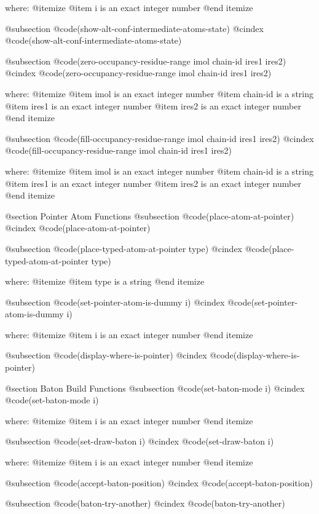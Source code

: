 where: 
 @itemize 
     @item i is an exact integer number
 @end itemize


@subsection @code{(show-alt-conf-intermediate-atoms-state)}
@cindex @code{(show-alt-conf-intermediate-atoms-state)}
 
@subsection @code{(zero-occupancy-residue-range imol chain-id ires1 ires2)}
@cindex @code{(zero-occupancy-residue-range imol chain-id ires1 ires2)}
 
where: 
 @itemize 
     @item imol is an exact integer number
     @item chain-id is a string
     @item ires1 is an exact integer number
     @item ires2 is an exact integer number
 @end itemize


@subsection @code{(fill-occupancy-residue-range imol chain-id ires1 ires2)}
@cindex @code{(fill-occupancy-residue-range imol chain-id ires1 ires2)}
 
where: 
 @itemize 
     @item imol is an exact integer number
     @item chain-id is a string
     @item ires1 is an exact integer number
     @item ires2 is an exact integer number
 @end itemize



@section Pointer Atom Functions 
@subsection @code{(place-atom-at-pointer)}
@cindex @code{(place-atom-at-pointer)}
 
@subsection @code{(place-typed-atom-at-pointer type)}
@cindex @code{(place-typed-atom-at-pointer type)}
 
where: 
 @itemize 
     @item type is a string
 @end itemize


@subsection @code{(set-pointer-atom-is-dummy i)}
@cindex @code{(set-pointer-atom-is-dummy i)}
 
where: 
 @itemize 
     @item i is an exact integer number
 @end itemize


@subsection @code{(display-where-is-pointer)}
@cindex @code{(display-where-is-pointer)}
 

@section Baton Build Functions 
@subsection @code{(set-baton-mode i)}
@cindex @code{(set-baton-mode i)}
 
where: 
 @itemize 
     @item i is an exact integer number
 @end itemize


@subsection @code{(set-draw-baton i)}
@cindex @code{(set-draw-baton i)}
 
where: 
 @itemize 
     @item i is an exact integer number
 @end itemize


@subsection @code{(accept-baton-position)}
@cindex @code{(accept-baton-position)}
 
@subsection @code{(baton-try-another)}
@cindex @code{(baton-try-another)}
 
